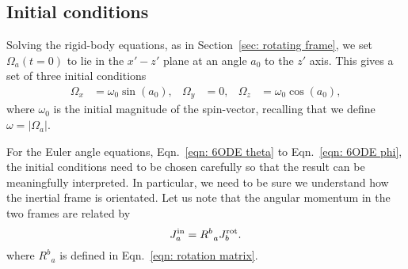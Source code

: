 \documentclass[../full_thesis/full_thesis.tex]{subfiles}
\begin{document}
\subsection{Initial conditions}
\label{sec: initial conditions}

Solving the rigid-body equations, as in Section~\ref{sec:
rotating frame}, we set
$\Omega_a(t=0)$ to lie in the $x' - z'$ plane at an angle $a_{0}$ to the
$z'$ axis. This gives a set of three initial conditions
\begin{align}
\Omega_{x} & = \omega_{0}\sin(a_{0}), &
\Omega_{y} & = 0, &
\Omega_{z} & = \omega_{0}\cos(a_{0}),
\label{eqn: spin init}
\end{align}
where $\omega_0$ is the initial magnitude of the spin-vector, recalling that
we define $\omega = |\Omega_a|$.

For the Euler angle equations, Eqn.~\eqref{eqn: 6ODE theta} to
Eqn.~\eqref{eqn: 6ODE phi}, the initial conditions need to be chosen carefully
so that the result can be meaningfully interpreted. In particular, we need to
be sure we understand how the inertial frame is orientated. Let us note that
the angular momentum in the two frames are related by
\begin{equation}
J^{\textrm{in}}_a = R^{b}_{\;\;a} J^{\textrm{rot}}_b .
\label{eqn: transform}
\end{equation}
where $R^{b}_{\;\;a}$ is defined in Eqn.~\eqref{eqn: rotation matrix}.
\end{document}

